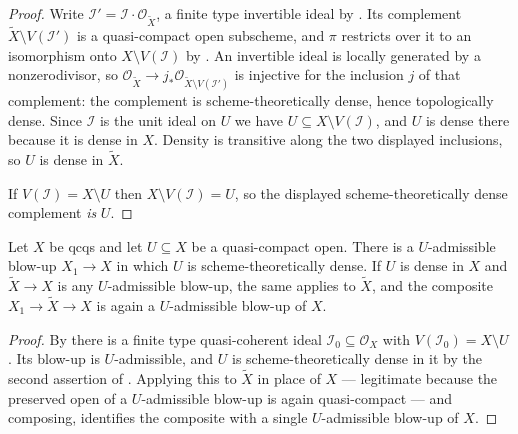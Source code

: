 \begin{proof}
  \leanok
  Write $\mathcal I'=\mathcal I\cdot\mathcal O_{\widetilde X}$, a finite type
  invertible ideal by .  Its
  complement $\widetilde X\setminus V(\mathcal I')$ is a quasi-compact open
  subscheme, and $\pi$ restricts over it to an isomorphism onto
  $X\setminus V(\mathcal I)$ by .
  An invertible ideal is locally generated by a nonzerodivisor, so
  $\mathcal O_{\widetilde X}\to j_*\mathcal O_{\widetilde X\setminus
  V(\mathcal I')}$ is injective for the inclusion $j$ of that complement:
  the complement is scheme-theoretically dense, hence topologically dense.
  Since $\mathcal I$ is the unit ideal on $U$ we have
  $U\subseteq X\setminus V(\mathcal I)$, and $U$ is dense there because it is
  dense in $X$.  Density is transitive along the two displayed inclusions, so
  $U$ is dense in $\widetilde X$.

  If $V(\mathcal I)=X\setminus U$ then $X\setminus V(\mathcal I)=U$, so the
  displayed scheme-theoretically dense complement \emph{is} $U$.
\end{proof}

\begin{lemma}
  \label{lemma:nagata-conrad-schematically-dense-blowup}
  \leanok

  Let $X$ be qcqs and let $U\subseteq X$ be a quasi-compact open.  There is a
  $U$-admissible blow-up $X_1\to X$ in which $U$ is scheme-theoretically
  dense.  If $U$ is dense in $X$ and $\widetilde X\to X$ is any $U$-admissible
  blow-up, the same applies to $\widetilde X$, and the composite
  $X_1\to\widetilde X\to X$ is again a $U$-admissible blow-up of $X$.
\end{lemma}

\begin{proof}
  \leanok
  By  there is a finite
  type quasi-coherent ideal $\mathcal I_0\subseteq\mathcal O_X$ with
  $V(\mathcal I_0)=X\setminus U$.  Its blow-up is $U$-admissible, and $U$ is
  scheme-theoretically dense in it by the second assertion of
  .  Applying this to
  $\widetilde X$ in place of $X$ --- legitimate because the preserved open of
  a $U$-admissible blow-up is again quasi-compact --- and composing,
   identifies the composite with a
  single $U$-admissible blow-up of $X$.
\end{proof}

